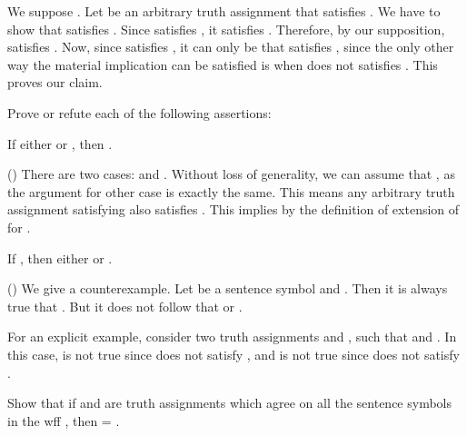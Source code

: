 		  \qquad
		We suppose . Let  be an arbitrary truth assignment that satisfies . We have to show that  satisfies . Since  satisfies , it satisfies . Therefore, by our supposition,  satisfies . Now, since  satisfies , it can only be that  satisfies , since the only other way the material implication can be satisfied is when  does not satisfies . This proves our claim.
	\stopsolution

	\startexercise [title={Enderton, 1.2.5}]
		Prove or refute each of the following assertions:
		\startitemize [a, joinedup]

			\item  If either  or , then .

				\startsolution
					()  \qquad
					There are two cases:  and . Without loss of generality, we can assume that , as the argument for other case is exactly the same. This means any arbitrary truth assignment  satisfying  also satisfies . This implies  by the definition of extension of  for .
				\stopsolution

			\item  If , then either  or .

				\startsolution
					()  \qquad
					We give a counterexample. Let  be a sentence symbol and . Then it is always true that . But it does not follow that  or .

					For an explicit example, consider two truth assignments  and , such that  and . In this case,  is not true since  does not satisfy , and  is not true since  does not satisfy .
				\stopsolution
		\stopitemize
	\stopexercise

	\page
	\startexercise [title={Enderton, 1.2.6}]
		\startitemize [a, joinedup]

			\item[uniqueness]  Show that if  and  are truth assignments which agree on all the sentence symbols in the wff , then  = .

				\startsolution
					
